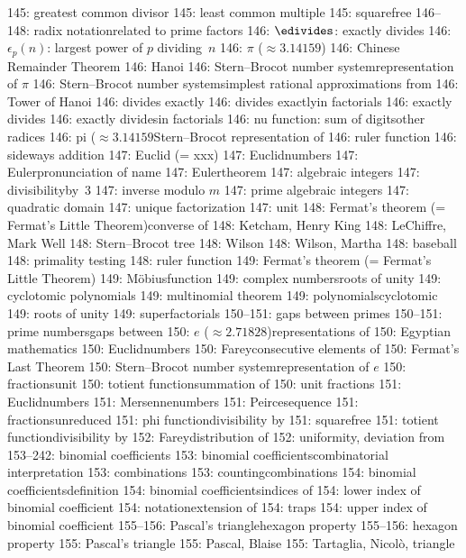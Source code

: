 145: greatest common divisor
145: least common multiple
145: squarefree
146--148: radix notation\sub related to prime factors
146: $\edivides$: exactly divides
146: $\epsilon_p(n)$: largest power of $p$ dividing~$n$
146: $\pi$ ($\approx3.14159$)
146: Chinese Remainder Theorem
146: Hanoi
146: Stern--Brocot number system\sub representation of $\pi$
146: Stern--Brocot number system\sub simplest rational approximations from
146: Tower of Hanoi
146: divides exactly
146: divides exactly\sub in factorials
146: exactly divides
146: exactly divides\sub in factorials
146: nu function: sum of digits\sub other radices
146: pi ($\approx3.14159$\sub Stern--Brocot representation of
146: ruler function
146: sideways addition
147: Euclid (= xxx)
147: Euclid\sub numbers
147: Euler\sub pronunciation of name
147: Euler\sub theorem
147: algebraic integers
147: divisibility\sub by~$3$
147: inverse modulo $m$
147: prime algebraic integers
147: quadratic domain
147: unique factorization
147: unit
148: Fermat's theorem (= Fermat's Little Theorem)\sub converse of
148: Ketcham, Henry King
148: LeChiffre, Mark Well
148: Stern--Brocot tree
148: Wilson
148: Wilson, Martha
148: baseball
148: primality testing
148: ruler function
149: Fermat's theorem (= Fermat's Little Theorem)
149: M\"obius\sub function
149: complex numbers\sub roots of unity
149: cyclotomic polynomials
149: multinomial theorem
149: polynomials\sub cyclotomic
149: roots of unity
149: superfactorials
150--151: gaps between primes
150--151: prime numbers\sub gaps between
150: $e$ ($\approx2.71828$)\sub representations of
150: Egyptian mathematics
150: Euclid\sub numbers
150: Farey\sub consecutive elements of
150: Fermat's Last Theorem
150: Stern--Brocot number system\sub representation of $e$
150: fractions\sub unit
150: totient function\sub summation of
150: unit fractions
151: Euclid\sub numbers
151: Mersenne\sub numbers
151: Peirce\sub sequence
151: fractions\sub unreduced
151: phi function\sub divisibility by
151: squarefree
151: totient function\sub divisibility by
152: Farey\sub distribution of
152: uniformity, deviation from
153--242: binomial coefficients
153: binomial coefficients\sub combinatorial interpretation
153: combinations
153: counting\sub combinations
154: binomial coefficients\sub definition
154: binomial coefficients\sub indices of
154: lower index of binomial coefficient
154: notation\sub extension of
154: traps
154: upper index of binomial coefficient
155--156: Pascal's triangle\sub hexagon property
155--156: hexagon property
155: Pascal's triangle
155: Pascal, Blaise
155: Tartaglia, Nicol\`o, triangle
